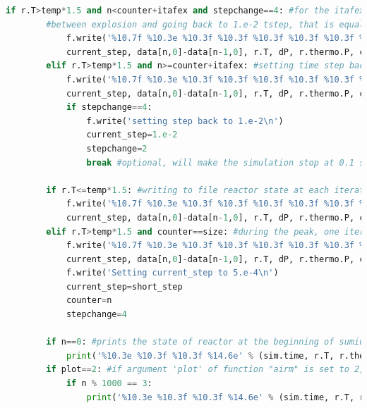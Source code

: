 \documentclass[a4paper]{article}
\begin{document}
\begin{lstlisting}[language=python]    
        if r.T>temp*1.5 and n<counter+itafex and stepchange==4: #for the itafex number of interations 
        #between explosion and going back to 1.e-2 tstep, that is equal to 0.0225 [s]
            f.write('%10.7f %10.3e %10.3f %10.3f %10.3f %10.3f %10.3f %10.3f\n' % (sim.time,
            current_step, data[n,0]-data[n-1,0], r.T, dP, r.thermo.P, counter, n)) 
        elif r.T>temp*1.5 and n>=counter+itafex: #setting time step back to 1.e-2, 0.00225 seconds after the explosion
            f.write('%10.7f %10.3e %10.3f %10.3f %10.3f %10.3f %10.3f %10.3f\n' % (sim.time,
            current_step, data[n,0]-data[n-1,0], r.T, dP, r.thermo.P, counter, n)) 
            if stepchange==4:
                f.write('setting step back to 1.e-2\n')
                current_step=1.e-2
                stepchange=2
                break #optional, will make the simulation stop at 0.1 seconds after the ignition.
            
        if r.T<=temp*1.5: #writing to file reactor state at each iteration before the explosion 
            f.write('%10.7f %10.3e %10.3f %10.3f %10.3f %10.3f %10.3f %10.3f\n' % (sim.time,
            current_step, data[n,0]-data[n-1,0], r.T, dP, r.thermo.P, counter, n))      
        elif r.T>temp*1.5 and counter==size: #during the peak, one iteration where counter is still set as size
            f.write('%10.7f %10.3e %10.3f %10.3f %10.3f %10.3f %10.3f %10.3f\n' % (sim.time,
            current_step, data[n,0]-data[n-1,0], r.T, dP, r.thermo.P, counter, n)) 
            f.write('Setting current_step to 5.e-4\n')
            current_step=short_step
            counter=n
            stepchange=4
         
        if n==0: #prints the state of reactor at the beginning of sumiulaton
            print('%10.3e %10.3f %10.3f %14.6e' % (sim.time, r.T, r.thermo.P, r.thermo.u)) 
        if plot==2: #if argument 'plot' of function "airm" is set to 2, state of the reactor will be printed once a 1000 iterations
            if n % 1000 == 3:
                print('%10.3e %10.3f %10.3f %14.6e' % (sim.time, r.T, r.thermo.P, r.thermo.u))
\end{lstlisting}
\end{document}
